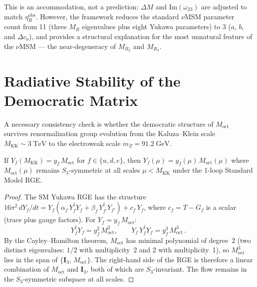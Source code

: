 This is an accommodation, not a prediction: $\Delta M$ and $\mathrm{Im}(\omega_{23})$ are adjusted to match $\eta_B^{\mathrm{obs}}$. However, the framework reduces the standard $\nu$MSM parameter count from 11 (three $M_R$ eigenvalues plus eight Yukawa parameters) to 3 ($a$, $b$, and $\Delta c_\nu$), and provides a structural explanation for the most unnatural feature of the $\nu$MSM --- the near-degeneracy of $M_{R_2}$ and $M_{R_3}$.


\section{Radiative Stability of the Democratic Matrix}
\label{sec:4-radiative-stability}

A necessary consistency check is whether the democratic structure of $M_{\mathrm{oct}}$ survives renormalization group evolution from the Kaluza--Klein scale $M_{\mathrm{KK}} \sim 3\;\mathrm{TeV}$ to the electroweak scale $m_Z = 91.2\;\mathrm{GeV}$.

\begin{proposition}\label{prop:4-s3-rge}
If $Y_f(M_{\mathrm{KK}}) = y_f\, M_{\mathrm{oct}}$ for $f \in \{u, d, e\}$, then $Y_f(\mu) = y_f(\mu)\, M_{\mathrm{oct}}(\mu)$ where $M_{\mathrm{oct}}(\mu)$ remains $S_3$-symmetric at all scales $\mu < M_{\mathrm{KK}}$ under the 1-loop Standard Model RGE.
\end{proposition}

\begin{proof}
The SM Yukawa RGE has the structure $16\pi^2\, dY_f/dt = Y_f(\alpha_f\, Y_f^\dagger Y_f + \beta_f\, Y_{f'}^\dagger Y_{f'}) + c_f\, Y_f$, where $c_f = T - G_f$ is a scalar (trace plus gauge factors). For $Y_f = y_f\, M_{\mathrm{oct}}$:
\begin{equation}
  Y_f^\dagger Y_f = y_f^2\, M_{\mathrm{oct}}^2, \qquad
  Y_f\, Y_f^\dagger Y_f = y_f^3\, M_{\mathrm{oct}}^3\,.
  \label{eq:4-112}
\end{equation}
By the Cayley--Hamilton theorem, $M_{\mathrm{oct}}$ has minimal polynomial of degree~2 (two distinct eigenvalues: $1/2$ with multiplicity~2 and $2$ with multiplicity~1), so $M_{\mathrm{oct}}^3$ lies in the span of $\{\mathbf{I}_3,\, M_{\mathrm{oct}}\}$. The right-hand side of the RGE is therefore a linear combination of $M_{\mathrm{oct}}$ and $\mathbf{I}_3$, both of which are $S_3$-invariant. The flow remains in the $S_3$-symmetric subspace at all scales.
\end{proof}

